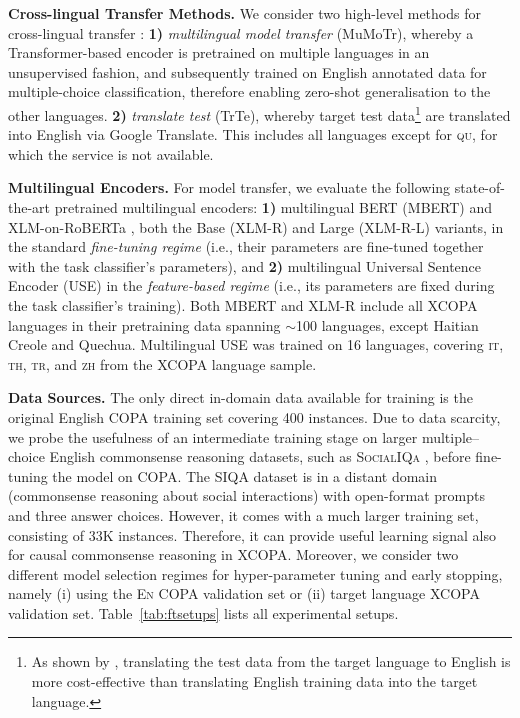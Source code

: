 \documentclass[11pt,a4paper]{article}
\begin{document}
\vspace{1.4mm}
\noindent \textbf{Cross-lingual Transfer Methods.}
We consider two high-level methods for cross-lingual transfer \citep{tiedemann-2015-cross,Ponti:2019cl}: \textbf{1)} \textit{multilingual model transfer} (MuMoTr), whereby a Transformer-based encoder is pretrained on multiple languages in an unsupervised fashion, and subsequently trained on English annotated data for multiple-choice classification, therefore enabling zero-shot generalisation to the other languages. \textbf{2)} \textit{translate test} (TrTe), whereby target test data\footnote{As shown by \citet{Conneau:2018emnlp}, translating the test data from the target language to English is more cost-effective than translating English training data into the target language.} are translated into English via Google Translate. This includes all languages except for \textsc{qu}, for which the service is not available.




\vspace{1.4mm}
\noindent \textbf{Multilingual Encoders.}
For model transfer, we evaluate the following state-of-the-art pretrained multilingual encoders: \textbf{1)} multilingual BERT (MBERT) \cite{Devlin:2019bert} and XLM-on-RoBERTa \cite{conneau2019unsupervised}, both the Base (XLM-R) and Large (XLM-R-L) variants, in the standard \textit{fine-tuning regime} (i.e., their parameters are fine-tuned together with the task classifier's parameters), and \textbf{2)} multilingual Universal Sentence Encoder (USE) \cite{yang2019multilingual} in the \textit{feature-based regime} (i.e., its parameters are fixed during the task classifier's training). Both MBERT and XLM-R include all XCOPA languages in their pretraining data spanning $\sim$100 languages, except Haitian Creole and Quechua. Multilingual USE was trained on 16 languages, covering \textsc{it}, \textsc{th}, \textsc{tr}, and \textsc{zh} from the XCOPA language sample.

\vspace{1.4mm}
\noindent \textbf{Data Sources.} The only direct in-domain data available for training is the original English COPA training set covering 400 instances. 
Due to data scarcity, we probe the usefulness of an intermediate training stage \citep{phang2018sentence,glavavs2020supervised} on larger multiple--choice English commonsense reasoning datasets, such as \textsc{SocialIQa} \cite[SIQA;][]{Sap:2019siqa}, before fine-tuning the model on COPA. The SIQA dataset is in a distant domain (commonsense reasoning about social interactions) with open-format prompts and three answer choices. However, it comes with a much larger training set, consisting of 33K instances. Therefore, it can provide useful learning signal also for causal commonsense reasoning in XCOPA. Moreover, we consider two different model selection regimes for hyper-parameter tuning and early stopping, namely (i) using the \textsc{En} COPA validation set or (ii) target language XCOPA validation set. Table~\ref{tab:ftsetups} lists all experimental setups.
\end{document}
